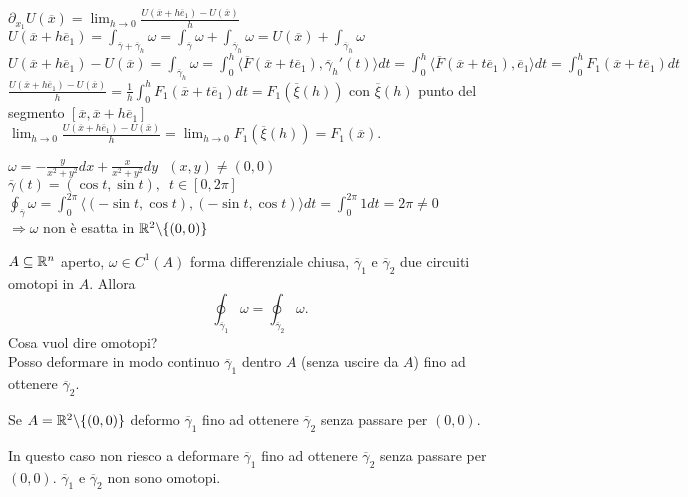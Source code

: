 \begin{dembar}
	\segnaposto %

	$\partial_{x_1}U(\overline{x})= \lim_{h\rightarrow 0}\frac{U(\overline{x}+h\overline{e}_1)-U(\overline{x})}{h}$\\
	$U(\overline{x} + h \overline{e}_1 )=\int_{\overline{\gamma}+\overline{\gamma}_h}\omega=\int_{\overline{\gamma}}\omega+\int_{\overline{\gamma}_h}\omega= U(\overline{x})+\int_{\overline{\gamma}_h}\omega$\\
	$U(\overline{x}+h \overline{e}_1)-U(\overline{x})=\int_{\overline{\gamma}_h}\omega=\int_0^h\langle \overline{F}(\overline{x}+t\overline{e}_1),\overline{\gamma}_h'(t)\rangle dt = \int_0^h \langle \overline{F}(\overline{x}+t\overline{e}_1),\overline{e}_1 \rangle dt = \int_0^h F_1(\overline{x}+t\overline{e}_1)dt$\\
	$\frac{U(\overline{x}+h\overline{e}_1)-U(\overline{x})}{h}=\frac{1}{h}\int_0^h F_1(\overline{x}+t\overline{e}_1)dt=F_1(\overline{\xi}(h))$ con $\overline{\xi}(h)$ punto del segmento $[\overline{x},\overline{x}+h\overline{e}_1]$\\
	$\lim_{h\rightarrow 0} \frac{U(\overline{x}+h\overline{e}_1)-U(\overline{x})}{h}=\lim_{h\rightarrow 0} F_1 (\overline{\xi}(h))=F_1(\overline{x})$.
\end{dembar}


\begin{exbar}
\begin{example}
	$\omega= -\frac{y}{x^2+y^2} dx +\frac{x}{x^2+y^2}dy\,\,\,\, (x,y)\neq (0,0)$\\
	$\overline{\gamma}(t)=(\cos t, \sin t),\,\,\, t \in [0,2\pi]$\\
	$\oint_{\overline{\gamma}}\omega =\int_0^{2\pi}\langle (-\sin t, \cos t),(-\sin t , \cos t) \rangle dt = \int_0^{2\pi} 1dt=2\pi\neq 0$\\
	$\Rightarrow \omega$ non è esatta in  $\mathbb{R}^2 \backslash \{(0,0)\}$
\end{example}
\end{exbar}


\begin{theorem}
	$A \subseteq \mathbb{R}^n$ aperto, $\omega \in C^1(A)$ forma differenziale chiusa, $\overline{\gamma}_1$ e $\overline{\gamma}_2$ due circuiti omotopi in $A$. Allora
	\begin{equation*}
		\oint_{\overline{\gamma}_1}\omega=\oint_{\overline{\gamma}_2}\omega.
	\end{equation*}
	Cosa vuol dire omotopi?\\
	Posso deformare in modo continuo $\overline{\gamma}_1$ dentro $A$ (senza uscire da $A$) fino ad ottenere $\overline{\gamma}_2$.
	
	\segnaposto %
	
	Se $A=\mathbb{R}^2\backslash\{(0,0)\}$ deformo $\overline{\gamma}_1$ fino ad ottenere $\overline{\gamma}_2$ senza passare per $(0,0)$.\\
	
	\segnaposto %
	
	In questo caso non riesco a deformare $\overline{\gamma}_1$ fino ad ottenere $\overline{\gamma}_2$ senza passare per $(0,0)$. $\overline{\gamma}_1$ e $\overline{\gamma}_2$ non sono omotopi. 	
\end{theorem}


